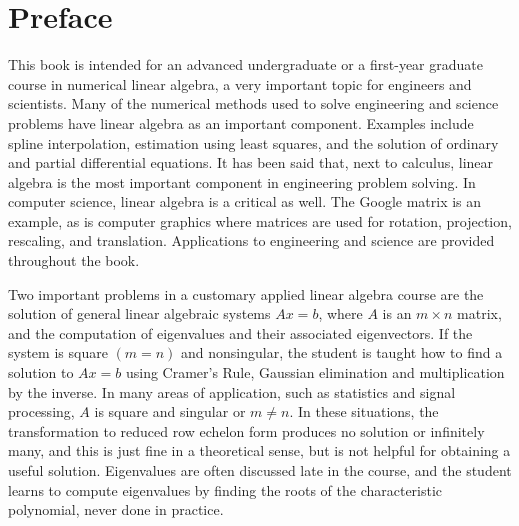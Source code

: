 \documentclass[../main.tex]{subfiles}
\begin{document}
\chapter*{Preface}

This book is intended for an advanced undergraduate or a first-year graduate course in numerical linear algebra, a very important topic for engineers and scientists. Many of the numerical methods used to solve engineering and science problems have linear algebra as an important component. Examples include spline interpolation, estimation using least squares, and the solution of ordinary and partial differential equations. It has been said that, next to calculus, linear algebra is the most important component in engineering problem solving. In computer science, linear algebra is a critical as well. The Google matrix is an example, as is computer graphics where matrices are used for rotation, projection, rescaling, and translation. Applications to engineering and science are provided throughout the book.

Two important problems in a customary applied linear algebra course are the solution of general linear algebraic systems $Ax = b$, where $A$ is an $m \times n$ matrix, and the computation of eigenvalues and their associated eigenvectors. If the system is square $(m = n)$ and nonsingular, the student is taught how to find a solution to $Ax = b$ using Cramer’s Rule, Gaussian elimination and multiplication by the inverse. In many areas of application, such as statistics and signal processing, $A$ is square and singular or $m \neq n$. In these situations, the transformation to reduced row echelon form produces no solution or infinitely many, and this is just fine in a theoretical sense, but is not helpful for obtaining a useful solution. Eigenvalues are often discussed late in the course, and the student learns to compute eigenvalues by finding the roots of the characteristic polynomial, never done in practice.
\end{document}

